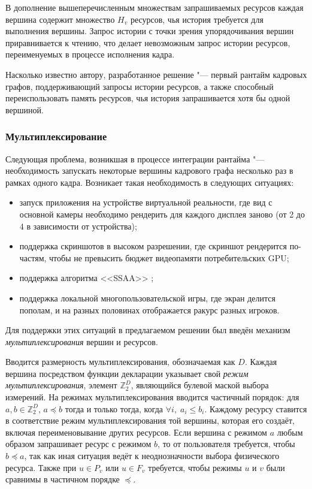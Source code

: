 В дополнение вышеперечисленным множествам запрашиваемых ресурсов каждая вершина содержит множество $H_v$ ресурсов, чья история требуется для выполнения вершины.
Запрос истории с точки зрения упорядочивания вершин приравнивается к чтению, что делает невозможным запрос истории ресурсов, переименуемых в процессе исполнения кадра.

Насколько известно автору, разработанное решение "--- первый рантайм кадровых графов, поддерживающий запросы истории ресурсов, а также способный переиспользовать память ресурсов, чья история запрашивается хотя бы одной вершиной.

\subsubsection{Мультиплексирование}
Следующая проблема, возникшая в процессе интеграции рантайма "--- необходимость запускать некоторые вершины кадрового графа несколько раз в рамках одного кадра.
Возникает такая необходимость в следующих ситуациях:
\begin{itemize}
    \item запуск приложения на устройстве виртуальной реальности, где вид с основной камеры необходимо рендерить для каждого дисплея заново (от 2 до 4 в зависимости от устройства);
    \item поддержка скриншотов в высоком разрешении, где скриншот рендерится по-частям, чтобы не превысить бюджет видеопамяти потребительских GPU;
    \item поддержка алгоритма <<SSAA>> \cite{barronsuper};
    \item поддержка локальной многопользовательской игры, где экран делится пополам, и на разных половинах отображается ракурс разных игроков.
\end{itemize}
Для поддержки этих ситуаций в предлагаемом решении был введён механизм \textit{мультиплексирования} вершин и ресурсов.

Вводится размерность мультиплексирования, обозначаемая как $D$.
Каждая вершина посредством функции декларации указывает свой \textit{режим мультиплексирования}, элемент $\mathbb{Z}_2^D$, являющийся булевой маской выбора измерений.
На режимах мультиплексирования вводится частичный порядок: для $a,b\in\mathbb{Z}_2^D$, $a \preceq b$ тогда и только тогда, когда $\forall i,\;a_i \leqslant b_i$.
Каждому ресурсу ставится в соответствие режим мультиплексирования той вершины, которая его создаёт, включая переименовывание других ресурсов.
Если вершина с режимом $a$ любым образом запрашивает ресурс с режимом $b$, то от пользователя требуется, чтобы $b \preceq a$, так как иная ситуация ведёт к неоднозначности выбора физического ресурса.
Также при $u \in P_v$ или $u \in F_v$ требуется, чтобы режимы $u$ и $v$ были сравнимы в частичном порядке $\preceq$.

